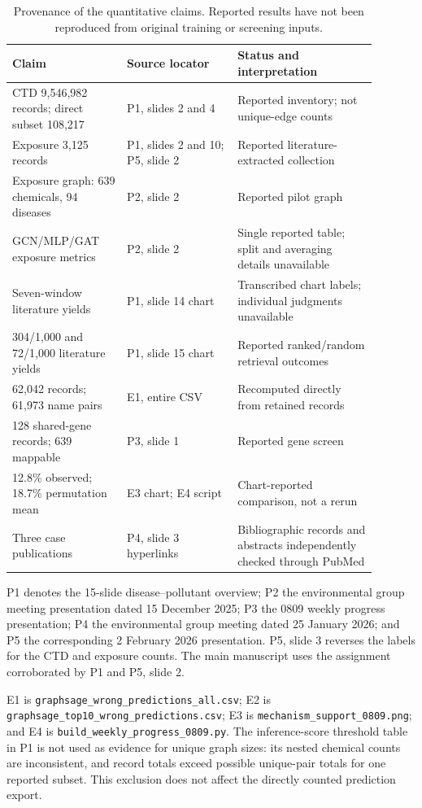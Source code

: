 \begin{table}[htbp]
\centering\small
\caption{Provenance of the quantitative claims. Reported results have not been reproduced from original training or screening inputs.}
\label{tab:provenance}
\begin{tabular}{p{0.28\linewidth}p{0.27\linewidth}p{0.34\linewidth}}
\toprule
Claim & Source locator & Status and interpretation \\
\midrule
CTD 9,546,982 records; direct subset 108,217 & P1, slides 2 and 4 & Reported inventory; not unique-edge counts \\
Exposure 3,125 records & P1, slides 2 and 10; P5, slide 2 & Reported literature-extracted collection \\
Exposure graph: 639 chemicals, 94 diseases & P2, slide 2 & Reported pilot graph \\
GCN/MLP/GAT exposure metrics & P2, slide 2 & Single reported table; split and averaging details unavailable \\
Seven-window literature yields & P1, slide 14 chart & Transcribed chart labels; individual judgments unavailable \\
304/1,000 and 72/1,000 literature yields & P1, slide 15 chart & Reported ranked/random retrieval outcomes \\
62,042 records; 61,973 name pairs & E1, entire CSV & Recomputed directly from retained records \\
128 shared-gene records; 639 mappable & P3, slide 1 & Reported gene screen \\
12.8\% observed; 18.7\% permutation mean & E3 chart; E4 script & Chart-reported comparison, not a rerun \\
Three case publications & P4, slide 3 hyperlinks & Bibliographic records and abstracts independently checked through PubMed \\
\bottomrule
\end{tabular}
\end{table}

P1 denotes the 15-slide disease--pollutant overview; P2 the environmental group meeting presentation dated 15 December 2025; P3 the 0809 weekly progress presentation; P4 the environmental group meeting dated 25 January 2026; and P5 the corresponding 2 February 2026 presentation. P5, slide 3 reverses the labels for the CTD and exposure counts. The main manuscript uses the assignment corroborated by P1 and P5, slide 2.

E1 is \nolinkurl{graphsage_wrong_predictions_all.csv}; E2 is \nolinkurl{graphsage_top10_wrong_predictions.csv}; E3 is \nolinkurl{mechanism_support_0809.png}; and E4 is \nolinkurl{build_weekly_progress_0809.py}. The inference-score threshold table in P1 is not used as evidence for unique graph sizes: its nested chemical counts are inconsistent, and record totals exceed possible unique-pair totals for one reported subset. This exclusion does not affect the directly counted prediction export.

